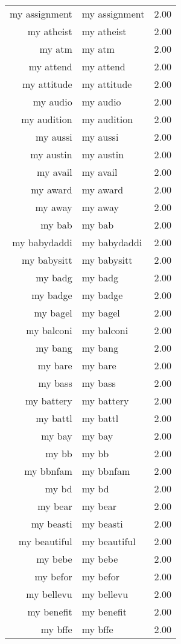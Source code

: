 \begin{table}[ht]
\begin{tabular}{rlr}
  my assignment & my assignment & 2.00 \\ 
  my atheist & my atheist & 2.00 \\ 
  my atm & my atm & 2.00 \\ 
  my attend & my attend & 2.00 \\ 
  my attitude & my attitude & 2.00 \\ 
  my audio & my audio & 2.00 \\ 
  my audition & my audition & 2.00 \\ 
  my aussi & my aussi & 2.00 \\ 
  my austin & my austin & 2.00 \\ 
  my avail & my avail & 2.00 \\ 
  my award & my award & 2.00 \\ 
  my away & my away & 2.00 \\ 
  my bab & my bab & 2.00 \\ 
  my babydaddi & my babydaddi & 2.00 \\ 
  my babysitt & my babysitt & 2.00 \\ 
  my badg & my badg & 2.00 \\ 
  my badge & my badge & 2.00 \\ 
  my bagel & my bagel & 2.00 \\ 
  my balconi & my balconi & 2.00 \\ 
  my bang & my bang & 2.00 \\ 
  my bare & my bare & 2.00 \\ 
  my bass & my bass & 2.00 \\ 
  my battery & my battery & 2.00 \\ 
  my battl & my battl & 2.00 \\ 
  my bay & my bay & 2.00 \\ 
  my bb & my bb & 2.00 \\ 
  my bbnfam & my bbnfam & 2.00 \\ 
  my bd & my bd & 2.00 \\ 
  my bear & my bear & 2.00 \\ 
  my beasti & my beasti & 2.00 \\ 
  my beautiful & my beautiful & 2.00 \\ 
  my bebe & my bebe & 2.00 \\ 
  my befor & my befor & 2.00 \\ 
  my bellevu & my bellevu & 2.00 \\ 
  my benefit & my benefit & 2.00 \\ 
  my bffe & my bffe & 2.00 \\ 

\end{tabular}
\end{table}
